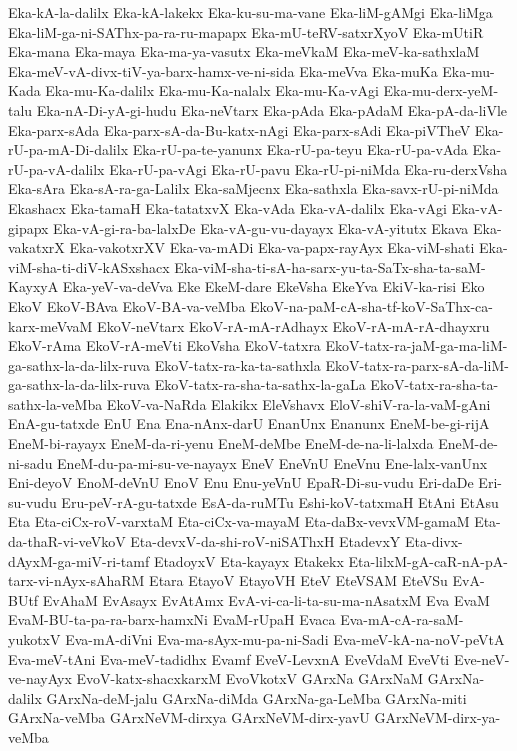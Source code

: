 {Eka-kA-la-dalilx
Eka-kA-lakekx
Eka-ku-su-ma-vane
Eka-liM-gAMgi
Eka-liMga
Eka-liM-ga-ni-SAThx-pa-ra-ru-mapapx
Eka-mU-teRV-satxrXyoV
Eka-mUtiR
Eka-mana
Eka-maya
Eka-ma-ya-vasutx
Eka-meVkaM
Eka-meV-ka-sathxlaM
Eka-meV-vA-divx-tiV-ya-barx-hamx-ve-ni-sida
Eka-meVva
Eka-muKa
Eka-mu-Kada
Eka-mu-Ka-dalilx
Eka-mu-Ka-nalalx
Eka-mu-Ka-vAgi
Eka-mu-derx-yeM-talu
Eka-nA-Di-yA-gi-hudu
Eka-neVtarx
Eka-pAda
Eka-pAdaM
Eka-pA-da-liVle
Eka-parx-sAda
Eka-parx-sA-da-Bu-katx-nAgi
Eka-parx-sAdi
Eka-piVTheV
Eka-rU-pa-mA-Di-dalilx
Eka-rU-pa-te-yanunx
Eka-rU-pa-teyu
Eka-rU-pa-vAda
Eka-rU-pa-vA-dalilx
Eka-rU-pa-vAgi
Eka-rU-pavu
Eka-rU-pi-niMda
Eka-ru-derxVsha
Eka-sAra
Eka-sA-ra-ga-Lalilx
Eka-saMjecnx
Eka-sathxla
Eka-savx-rU-pi-niMda
Ekashacx
Eka-tamaH
Eka-tatatxvX
Eka-vAda
Eka-vA-dalilx
Eka-vAgi
Eka-vA-gipapx
Eka-vA-gi-ra-ba-lalxDe
Eka-vA-gu-vu-dayayx
Eka-vA-yitutx
Ekava
Eka-vakatxrX
Eka-vakotxrXV
Eka-va-mADi
Eka-va-papx-rayAyx
Eka-viM-shati
Eka-viM-sha-ti-diV-kASxshacx
Eka-viM-sha-ti-sA-ha-sarx-yu-ta-SaTx-sha-ta-saM-KayxyA
Eka-yeV-va-deVva
Eke
EkeM-dare
EkeVsha
EkeYva
EkiV-ka-risi
Eko
EkoV
EkoV-BAva
EkoV-BA-va-veMba
EkoV-na-paM-cA-sha-tf-koV-SaThx-ca-karx-meVvaM
EkoV-neVtarx
EkoV-rA-mA-rAdhayx
EkoV-rA-mA-rA-dhayxru
EkoV-rAma
EkoV-rA-meVti
EkoVsha
EkoV-tatxra
EkoV-tatx-ra-jaM-ga-ma-liM-ga-sathx-la-da-lilx-ruva
EkoV-tatx-ra-ka-ta-sathxla
EkoV-tatx-ra-parx-sA-da-liM-ga-sathx-la-da-lilx-ruva
EkoV-tatx-ra-sha-ta-sathx-la-gaLa
EkoV-tatx-ra-sha-ta-sathx-la-veMba
EkoV-va-NaRda
Elakikx
EleVshavx
EloV-shiV-ra-la-vaM-gAni
EnA-gu-tatxde
EnU
Ena
Ena-nAnx-darU
EnanUnx
Enanunx
EneM-be-gi-rijA
EneM-bi-rayayx
EneM-da-ri-yenu
EneM-deMbe
EneM-de-na-li-lalxda
EneM-de-ni-sadu
EneM-du-pa-mi-su-ve-nayayx
EneV
EneVnU
EneVnu
Ene-lalx-vanUnx
Eni-deyoV
EnoM-deVnU
EnoV
Enu
Enu-yeVnU
EpaR-Di-su-vudu
Eri-daDe
Eri-su-vudu
Eru-peV-rA-gu-tatxde
EsA-da-ruMTu
Eshi-koV-tatxmaH
EtAni
EtAsu
Eta
Eta-ciCx-roV-varxtaM
Eta-ciCx-va-mayaM
Eta-daBx-vevxVM-gamaM
Eta-da-thaR-vi-veVkoV
Eta-devxV-da-shi-roV-niSAThxH
EtadevxY
Eta-divx-dAyxM-ga-miV-ri-tamf
EtadoyxV
Eta-kayayx
Etakekx
Eta-lilxM-gA-caR-nA-pA-tarx-vi-nAyx-sAhaRM
Etara
EtayoV
EtayoVH
EteV
EteVSAM
EteVSu
EvA-BUtf
EvAhaM
EvAsayx
EvAtAmx
EvA-vi-ca-li-ta-su-ma-nAsatxM
Eva
EvaM
EvaM-BU-ta-pa-ra-barx-hamxNi
EvaM-rUpaH
Evaca
Eva-mA-cA-ra-saM-yukotxV
Eva-mA-diVni
Eva-ma-sAyx-mu-pa-ni-Sadi
Eva-meV-kA-na-noV-peVtA
Eva-meV-tAni
Eva-meV-tadidhx
Evamf
EveV-LevxnA
EveVdaM
EveVti
Eve-neV-ve-nayAyx
EvoV-katx-shacxkarxM
EvoVkotxV
GArxNa
GArxNaM
GArxNa-dalilx
GArxNa-deM-jalu
GArxNa-diMda
GArxNa-ga-LeMba
GArxNa-miti
GArxNa-veMba
GArxNeVM-dirxya
GArxNeVM-dirx-yavU
GArxNeVM-dirx-ya-veMba
}
